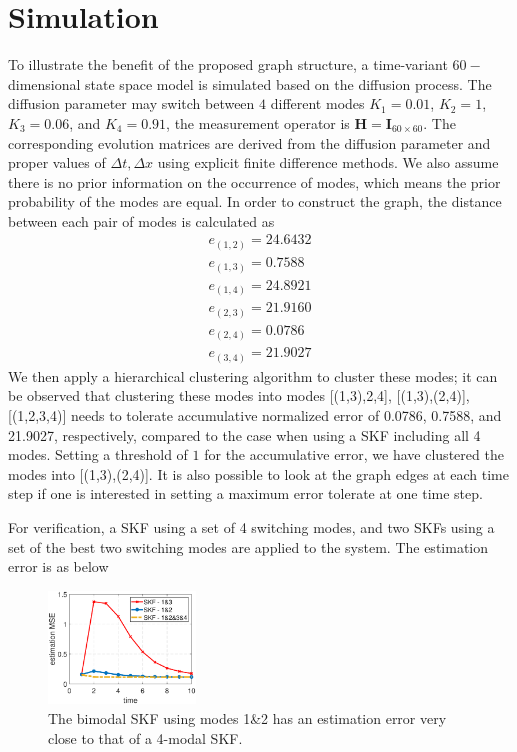 \documentclass[journal]{IEEEtran}
\begin{document}
\section{Simulation}\label{section:sim}
To illustrate the benefit of the proposed graph structure, a time-variant $60-$dimensional state space model is simulated based on the diffusion process. The diffusion parameter may switch between $4$ different modes $K_1 = 0.01$, $K_2 = 1$, $K_3=0.06$, and $K_4 = 0.91$, the measurement operator is $\bm{H}=\bm{I}_{60\times 60}$. The corresponding evolution matrices are derived from the diffusion parameter and proper values of $\Delta t,\Delta x$ using explicit finite difference methods. 
We also assume there is no prior information on the occurrence of modes, which means the prior probability of the modes are equal. In order to construct the graph, the distance between each pair of modes is calculated as
\begin{align*}
    e_{(1,2)} = 24.6432\\
    e_{(1,3)} = 0.7588 \\
    e_{(1,4)} = 24.8921\\
    e_{(2,3)} = 21.9160\\
    e_{(2,4)} = 0.0786 \\
    e_{(3,4)} = 21.9027
\end{align*}
We then apply a hierarchical clustering algorithm to cluster these modes; it can be observed that clustering these modes into modes [(1,3),2,4], [(1,3),(2,4)],[(1,2,3,4)] needs to tolerate accumulative normalized error of 0.0786, 0.7588, and 21.9027, respectively, compared to the case when using a SKF including all 4 modes. Setting a threshold of $1$ for the accumulative error, we have clustered the modes into [(1,3),(2,4)]. It is also possible to look at the graph edges at each time step if one is interested in setting a maximum error tolerate at one time step. 
       
For verification, a SKF using a set of 4 switching modes, and two SKFs using a set of the best two switching modes are applied to the system. The estimation error is as below
\begin{figure}
  \centering
    \includegraphics[width=0.35\textwidth]{error-diff.eps}
    \caption{ The bimodal SKF using modes 1&2 has an estimation error very close to that of a 4-modal SKF.  }
    \label{fig:rmodal}
        \vspace{-0.4cm}
\end{figure}
\end{document}
